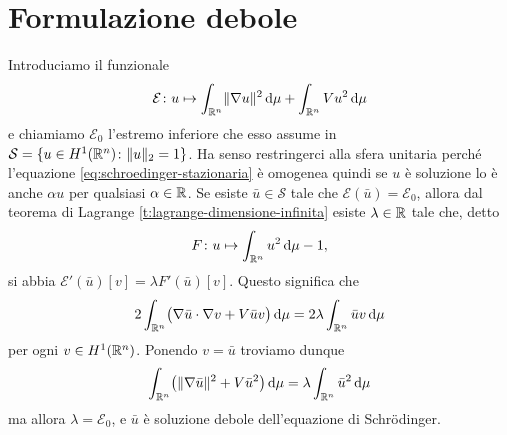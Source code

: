 \section{Formulazione debole}
\newcommand{\E}{\mathcal{E}}
\renewcommand{\S}{\mathcal{S}}
Introduciamo il funzionale
\begin{equation}
    \E\colon u\mapsto\int_{\R^n}\norm{\grad u}^2\,\dd\mu+\int_{\R^n}Vu^2\,\dd\mu
    \label{eq:funzionale-energia-schroedinger}
\end{equation}
e chiamiamo $\E_0$ l'estremo inferiore che esso assume in $\S=\{u\in\sobH[1]{\R^n}\colon\norm{u}_2=1\}$.
Ha senso restringerci alla sfera unitaria perch\'e l'equazione \eqref{eq:schroedinger-stazionaria} è omogenea quindi se $u$ è soluzione lo è anche $\alpha u$ per qualsiasi $\alpha\in\R$.
Se esiste $\bar{u}\in\S$ tale che $\E(\bar{u})=\E_0$, allora dal teorema di Lagrange \ref{t:lagrange-dimensione-infinita} esiste $\lambda\in\R$ tale che, detto
\begin{equation}
    F\colon u\mapsto\int_{\R^n}u^2\,\dd\mu-1,
\end{equation}
si abbia $\E'(\bar{u})[v]=\lambda F'(\bar{u})[v]$.
Questo significa che
\begin{equation}
    2\int_{\R^n}\bigl(\scalar{\grad\bar{u}}{\grad v}+V\bar{u}v\bigr)\,\dd\mu=2\lambda\int_{\R^n}\bar{u}v\,\dd\mu
\end{equation}
per ogni $v\in\sobH[1]{\R^n}$.
Ponendo $v=\bar{u}$ troviamo dunque
\begin{equation}
    \int_{\R^n}\bigl(\norm{\grad\bar{u}}^2+V\bar{u}^2\bigr)\,\dd\mu=\lambda\int_{\R^n}\bar{u}^2\,\dd\mu
\end{equation}
ma allora $\lambda=\E_0$, e $\bar{u}$ è soluzione debole dell'equazione di Schrödinger.

